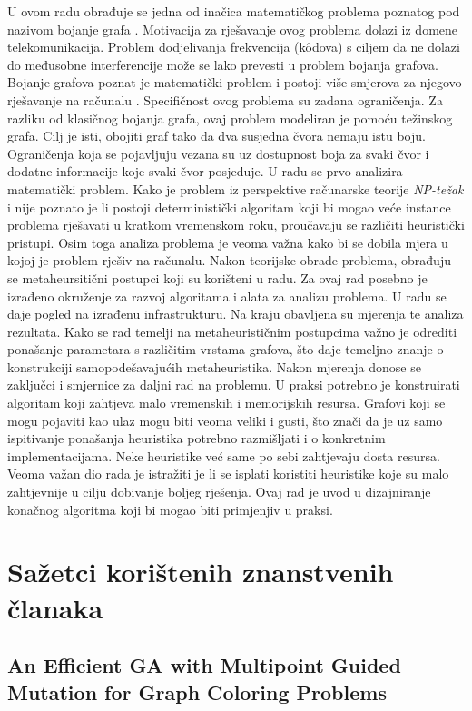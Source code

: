 \documentclass[times, utf8, diplomski, numeric]{fer}
\begin{document}
U ovom radu obrađuje se jedna od inačica matematičkog problema poznatog pod nazivom bojanje grafa . Motivacija za rješavanje ovog problema dolazi iz domene telekomunikacija. Problem dodjelivanja frekvencija (k\^{o}dova) s ciljem da ne dolazi do međusobne interferencije može se lako prevesti u problem bojanja grafova. Bojanje grafova poznat je matematički problem i postoji više smjerova za njegovo rješavanje na računalu \cite{lit8}. Specifičnost ovog problema su zadana ograničenja. Za razliku od klasičnog bojanja grafa, ovaj problem modeliran je pomoću težinskog grafa. Cilj je isti, obojiti graf tako da dva susjedna čvora nemaju istu boju. Ograničenja koja se pojavljuju vezana su uz dostupnost boja za svaki čvor i dodatne informacije koje svaki čvor posjeduje. U radu se prvo analizira matematički problem. Kako je problem iz perspektive računarske teorije \emph{NP-težak} i nije poznato je li postoji deterministički algoritam koji bi mogao veće instance problema rješavati u kratkom vremenskom roku, proučavaju se različiti heuristički pristupi. Osim toga analiza problema je veoma važna kako bi se dobila mjera u kojoj je problem rješiv na računalu. Nakon teorijske obrade problema, obrađuju se metaheursitični postupci koji su korišteni u radu. Za ovaj rad posebno je izrađeno okruženje za razvoj algoritama i alata za analizu problema. U radu se daje pogled na izrađenu infrastrukturu. Na kraju obavljena su mjerenja te analiza rezultata. Kako se rad temelji na metaheurističnim postupcima važno je odrediti ponašanje parametara s različitim vrstama grafova, što daje temeljno znanje o konstrukciji samopodešavajućih metaheuristika. Nakon mjerenja donose se zaključci i smjernice za daljni rad na problemu.
U praksi potrebno je konstruirati algoritam koji zahtjeva malo vremenskih i memorijskih resursa. Grafovi koji se mogu pojaviti kao ulaz mogu biti veoma veliki i gusti, što znači da je uz samo ispitivanje ponašanja heuristika potrebno razmišljati i o konkretnim implementacijama. Neke heuristike već same po sebi zahtjevaju dosta resursa. Veoma važan dio rada je istražiti je li se isplati koristiti heuristike koje su malo zahtjevnije u cilju dobivanje boljeg rješenja. Ovaj rad je uvod u dizajniranje konačnog algoritma koji bi mogao biti primjenjiv u praksi. 

\section{Sažetci korištenih znanstvenih članaka}

\subsection*{An Efficient GA with Multipoint Guided Mutation for Graph Coloring Problems \cite{lit1}}
\end{document}
